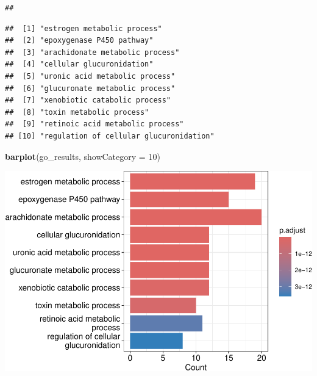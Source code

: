 \documentclass[
]{article}
\newenvironment{Shaded}{\begin{snugshade}}{\end{snugshade}}
\newcommand{\AttributeTok}[1]{\textcolor[rgb]{0.13,0.29,0.53}{#1}}
\newcommand{\CommentTok}[1]{\textcolor[rgb]{0.56,0.35,0.01}{\textit{#1}}}
\newcommand{\DecValTok}[1]{\textcolor[rgb]{0.00,0.00,0.81}{#1}}
\newcommand{\FunctionTok}[1]{\textcolor[rgb]{0.13,0.29,0.53}{\textbf{#1}}}
\newcommand{\NormalTok}[1]{#1}
\newcommand{\OtherTok}[1]{\textcolor[rgb]{0.56,0.35,0.01}{#1}}
\newcommand{\SpecialCharTok}[1]{\textcolor[rgb]{0.81,0.36,0.00}{\textbf{#1}}}
\newcommand{\StringTok}[1]{\textcolor[rgb]{0.31,0.60,0.02}{#1}}
\begin{document}
\begin{verbatim}
## 
\end{verbatim}

\begin{Shaded}
\end{Shaded}

\begin{verbatim}
##  [1] "estrogen metabolic process"            
##  [2] "epoxygenase P450 pathway"              
##  [3] "arachidonate metabolic process"        
##  [4] "cellular glucuronidation"              
##  [5] "uronic acid metabolic process"         
##  [6] "glucuronate metabolic process"         
##  [7] "xenobiotic catabolic process"          
##  [8] "toxin metabolic process"               
##  [9] "retinoic acid metabolic process"       
## [10] "regulation of cellular glucuronidation"
\end{verbatim}

\begin{Shaded}
\begin{Highlighting}[]
\FunctionTok{barplot}\NormalTok{(go\_results, }\AttributeTok{showCategory =} \DecValTok{10}\NormalTok{)}
\end{Highlighting}
\end{Shaded}

\includegraphics{lab5bio_files/figure-latex/first_com-1.pdf}
\end{document}
